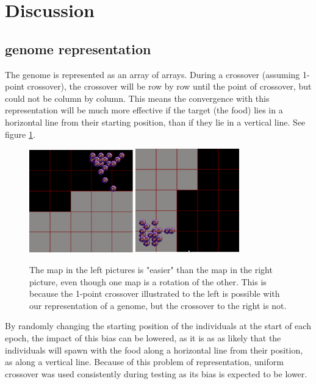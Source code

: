 \documentclass[a4paper,12pt]{article}
\begin{document}
\section{Discussion}
\subsection{genome representation}
The genome is represented as an array of arrays. During a crossover (assuming 1-point crossover), the crossover will be row by row until the point of crossover, but could not be column by column. This means the convergence with this representation will be much more effective if the target (the food) lies in a horizontal line from their starting position, than if they lie in a vertical line. See figure \ref{fig:bias}.

\begin{figure}[h!]
\includegraphics[width=0.4\textwidth]{TopRight.png}
\includegraphics[width=0.4\textwidth]{BottomLeft.png}
\caption{The map in the left pictures is "easier" than the map in the right picture, even though one map is a rotation of the other. This is because the 1-point crossover illustrated to the left is possible with our representation of a genome, but the crossover to the right is not.}
\label{fig:bias}
\end{figure}

By randomly changing the starting position of the individuals at the start of each epoch, the impact of this bias can be lowered, as it is as as likely that the individuals will spawn with the food along a horizontal line from their position, as along a vertical line. Because of this problem of representation, uniform crossover was used consistently during testing as its bias is expected to be lower.
\end{document}
